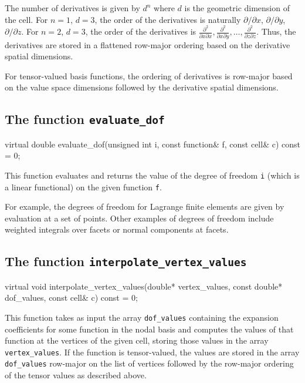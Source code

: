 The number of derivatives is given by $d^n$ where $d$ is the geometric
dimension of the cell. For $n = 1$, $d = 3$, the order of the
derivatives is naturally $\partial/\partial x$, $\partial/\partial y$,
$\partial/\partial z$. For $n = 2$, $d = 3$, the order of the
derivatives is $\frac{\partial^2}{\partial x\partial x},
\frac{\partial^2}{\partial x\partial y}, \ldots,
\frac{\partial^2}{\partial z\partial z}$. Thus, the derivatives are
stored in a flattened row-major ordering based on the derivative
spatial dimensions.

For tensor-valued basis functions, the ordering of derivatives is
row-major based on the value space dimensions followed by the
derivative spatial dimensions.

\subsection{The function \texttt{evaluate\_dof}}

\begin{code}
virtual double evaluate_dof(unsigned int i,
                            const function& f,
                            const cell& c) const = 0;
\end{code}

This function evaluates and returns the value of the degree of freedom
\texttt{i} (which is a linear functional) on the given function
\texttt{f}.
  
For example, the degrees of freedom for Lagrange finite elements are
given by evaluation at a set of points. Other examples of degrees of
freedom include weighted integrals over facets or normal components at
facets.

\subsection{The function \texttt{interpolate\_vertex\_values}}

\begin{code}
virtual void
interpolate_vertex_values(double* vertex_values,
                          const double* dof_values,
                          const cell& c) const = 0;
\end{code}

This function takes as input the array \texttt{dof\_values} containing
the expansion coefficients for some function in the nodal basis and
computes the values of that function at the vertices of the given
cell, storing those values in the array \texttt{vertex\_values}. If
the function is tensor-valued, the values are stored in the array
\texttt{dof\_values} row-major on the list of vertices followed by the
row-major ordering of the tensor values as described above.

